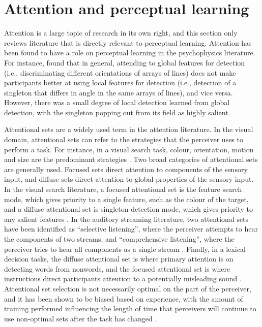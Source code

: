 \section{Attention and perceptual learning}
\label{sec:attention}

Attention is a large topic of research in its own right, and this section only reviews literature that is directly relevant to perceptual learning.
Attention has been found to have a role on perceptual learning in the psychophysics literature.  
For instance, \citet{Ahissar1993} found that in general, attending to global features for detection (i.e., discriminating different orientations of arrays of lines) does not make participants better at using local features for detection (i.e., detection of a singleton that differs in angle in the same arrays of lines), and vice versa.  However, there was a small degree of local detection learned from global detection, with the singleton popping out from its field as highly salient.

Attentional sets are a widely used term in the attention literature.  
In the visual domain, attentional sets can refer to the strategies that the perceiver uses to perform a task.  
For instance, in a visual search task, colour, orientation, motion and size are the predominant strategies \citep{Wolfe2004}.  
Two broad categories of attentional sets are generally used.  
Focused sets direct attention to components of the sensory input, and diffuse sets direct attention to global properties of the sensory input.  
In the visual search literature, a focused attentional set is the feature search mode, which gives priority to a single feature, such as the colour of the target, and a diffuse attentional set is singleton detection mode, which gives priority to any salient features \citep{Bacon1994}. 
In the auditory streaming literature, two attentional sets have been identified as ``selective listening'', where the perceiver attempts to hear the components of two streams, and ``comprehensive listening'', where the perceiver tries to hear all components as a single stream  \citep{vanNoorden1975}.
Finally, in a lexical decision tasks, the diffuse attentional set is where primary attention is on detecting words from nonwords, and the focused attentional set is where instructions direct participants attention to a potentially misleading sound \citep{Pitt2012}.
Attentional set selection is not necessarily optimal on the part of the perceiver, and it has been shown to be biased based on experience, with the amount of training performed influencing the length of time that perceivers will continue to use non-optimal sets after the task has changed \citep{Leber2006}.  

